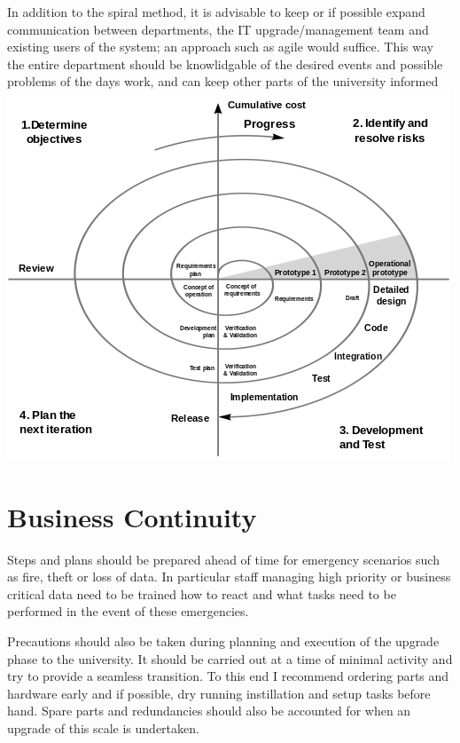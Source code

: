 \documentclass[10pt]{article}
\begin{document}
        In addition to the spiral method, it is advisable to keep or if possible expand communication between departments, the IT upgrade/management team and existing users of the system; an approach such as agile would suffice. This way the entire department should be knowlidgable of the desired events and possible problems of the days work, and can keep other parts of the university informed\\
        {
            \centering
            \includegraphics[scale=0.75]{spiralmodel.png}
        }

    \section{Business Continuity}
        Steps and plans should be prepared ahead of time for emergency scenarios such as fire, theft or loss of data. In particular staff managing high priority or business critical data need to be trained how to react and what tasks need to be performed in the event of these emergencies.

        Precautions should also be taken during planning and execution of the upgrade phase to the university. It should be carried out at a time of minimal activity and try to provide a seamless transition. To this end I recommend ordering parts and hardware early and if possible, dry running instillation and setup tasks before hand. Spare parts and redundancies should also be accounted for when an upgrade of this scale is undertaken. 
\end{document}
